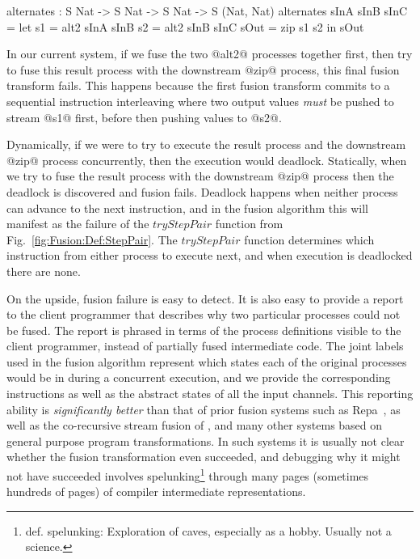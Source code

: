\begin{code}
  alternates : S Nat -> S Nat -> S Nat -> S (Nat, Nat)
  alternates sInA sInB sInC
   = let  s1   = alt2 sInA sInB
          s2   = alt2 sInB sInC
          sOut = zip s1 s2
     in   sOut
\end{code}

In our current system, if we fuse the two @alt2@ processes together first, then try to fuse this result process with the downstream @zip@ process, this final fusion transform fails. This happens because the first fusion transform commits to a sequential instruction interleaving where two output values \emph{must} be pushed to stream @s1@ first, before then pushing values to @s2@.

Dynamically, if we were to try to execute the result process and the downstream @zip@ process concurrently, then the execution would deadlock. Statically, when we try to fuse the result process with the downstream @zip@ process then the deadlock is discovered and fusion fails. Deadlock happens when neither process can advance to the next instruction, and in the fusion algorithm this will manifest as the failure of the $tryStepPair$ function from Fig.~\ref{fig:Fusion:Def:StepPair}. The $tryStepPair$ function determines which instruction from either process to execute next, and when execution is deadlocked there are none.

On the upside, fusion failure is easy to detect. It is also easy to provide a report to the client programmer that describes why two particular processes could not be fused. The report is phrased in terms of the process definitions visible to the client programmer, instead of partially fused intermediate code. The joint labels used in the fusion algorithm represent which states each of the original processes would be in during a concurrent execution, and we provide the corresponding instructions as well as the abstract states of all the input channels. This reporting ability is \emph{significantly better} than that of prior fusion systems such as Repa~\cite{lippmeier2012:guiding}, as well as the co-recursive stream fusion of \cite{coutts2007stream}, and many other systems based on general purpose program transformations. In such systems it is usually not clear whether the fusion transformation even succeeded, and debugging why it might not have succeeded involves spelunking\footnote{def. spelunking: Exploration of caves, especially as a hobby. Usually not a science.} through many pages (sometimes hundreds of pages) of compiler intermediate representations.

